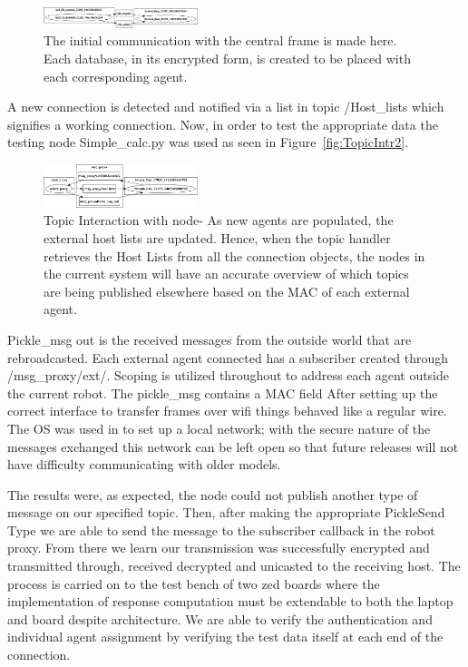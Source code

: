 \documentclass[conference]{IEEEtran}
\begin{document}
\begin{figure}[h]
\centering
\includegraphics[width=0.4\textwidth]{TopicIntr1}
\caption{The initial communication with the central frame is made here. Each database, in its encrypted form, is created to be placed with each corresponding agent.}
\label{fig:TopicIntr1}
\end{figure}

A new connection is detected and notified via a list in topic /Host\_lists which signifies a working connection. Now, in order to test the appropriate data the testing node Simple\_calc.py was used as seen in Figure~\autoref{fig:TopicIntr2}.

\begin{figure}[h]
\centering
\includegraphics[width=0.4\textwidth]{TopicIntr2}
\caption{Topic Interaction with node- As new agents are populated, the external host lists are updated. Hence, when the topic handler retrieves the Host Lists from all the connection objects, the nodes in the current system will have an accurate overview of which topics are being published elsewhere based on the MAC of each external agent.}
\label{fig:TopicIntr2}
\end{figure}

Pickle\_msg out is the received messages from the outside world that are rebroadcasted. Each external agent connected has a subscriber created through /msg\_proxy/ext/. Scoping is utilized throughout to address each agent outside the current robot. The pickle\_msg contains a MAC field After setting up the correct interface to transfer frames over wifi things behaved like a regular wire. The OS was used in to set up a local network; with the secure nature of the messages exchanged this network can be left open so that future releases will not have difficulty communicating with older models. 

The results were, as expected, the node could not publish another type of message on our specified topic. Then, after making the appropriate PickleSend Type we are able to send the message to the subscriber callback in the robot proxy. From there we learn our transmission was successfully encrypted and transmitted through, received decrypted and unicasted to the receiving host. The process is carried on to the test bench of two zed boards where the implementation of response computation must be extendable to both the laptop and board despite architecture. We are able to verify the authentication and individual agent assignment by verifying the test data itself at each end of the connection.
\end{document}
